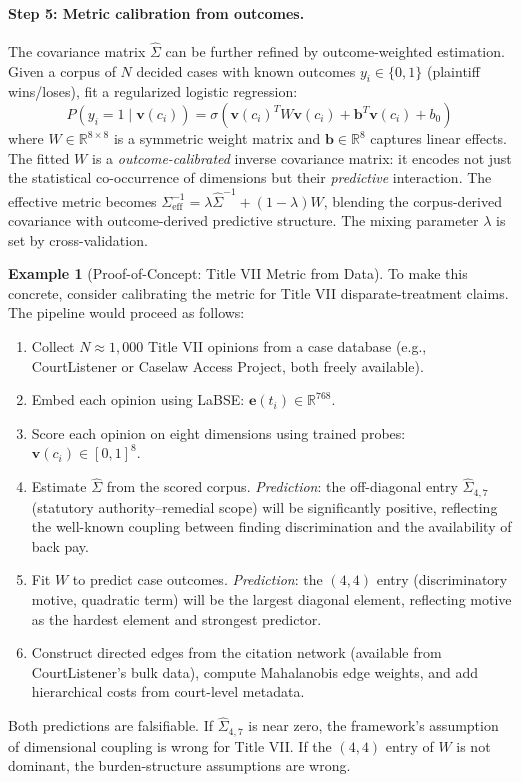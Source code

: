 \documentclass[12pt]{article}
\theoremstyle{definition}
\newtheorem{example}[theorem]{Example}
\theoremstyle{remark}
\newcommand{\R}{\mathbb{R}}
\begin{document}
\paragraph{Step 5: Metric calibration from outcomes.}  The covariance matrix $\hat{\Sigma}$ can be further refined by outcome-weighted estimation.  Given a corpus of $N$ decided cases with known outcomes $y_i \in \{0, 1\}$ (plaintiff wins/loses), fit a regularized logistic regression:
\begin{equation}
P(y_i = 1 \mid \mathbf{v}(c_i)) = \sigma\!\left(\mathbf{v}(c_i)^T W \mathbf{v}(c_i) + \mathbf{b}^T \mathbf{v}(c_i) + b_0\right)
\label{eq:weight_calibration}
\end{equation}
where $W \in \R^{8 \times 8}$ is a symmetric weight matrix and $\mathbf{b} \in \R^8$ captures linear effects.  The fitted $W$ is a \emph{outcome-calibrated} inverse covariance matrix: it encodes not just the statistical co-occurrence of dimensions but their \emph{predictive} interaction.  The effective metric becomes $\Sigma_{\text{eff}}^{-1} = \lambda \hat{\Sigma}^{-1} + (1 - \lambda) W$, blending the corpus-derived covariance with outcome-derived predictive structure.  The mixing parameter $\lambda$ is set by cross-validation.

\begin{example}[Proof-of-Concept: Title VII Metric from Data]
\label{ex:title_vii_calibration}
To make this concrete, consider calibrating the metric for Title VII disparate-treatment claims.  The pipeline would proceed as follows:
\begin{enumerate}
    \item Collect $N \approx 1{,}000$ Title VII opinions from a case database (e.g., CourtListener or Caselaw Access Project, both freely available).
    \item Embed each opinion using LaBSE: $\mathbf{e}(t_i) \in \R^{768}$.
    \item Score each opinion on eight dimensions using trained probes: $\mathbf{v}(c_i) \in [0,1]^8$.
    \item Estimate $\hat{\Sigma}$ from the scored corpus.  \emph{Prediction}: the off-diagonal entry $\hat{\Sigma}_{4,7}$ (statutory authority--remedial scope) will be significantly positive, reflecting the well-known coupling between finding discrimination and the availability of back pay.
    \item Fit $W$ to predict case outcomes.  \emph{Prediction}: the $(4,4)$ entry (discriminatory motive, quadratic term) will be the largest diagonal element, reflecting motive as the hardest element and strongest predictor.
    \item Construct directed edges from the citation network (available from CourtListener's bulk data), compute Mahalanobis edge weights, and add hierarchical costs from court-level metadata.
\end{enumerate}
Both predictions are falsifiable.  If $\hat{\Sigma}_{4,7}$ is near zero, the framework's assumption of dimensional coupling is wrong for Title VII.  If the $(4,4)$ entry of $W$ is not dominant, the burden-structure assumptions are wrong.
\end{example}
\end{document}
